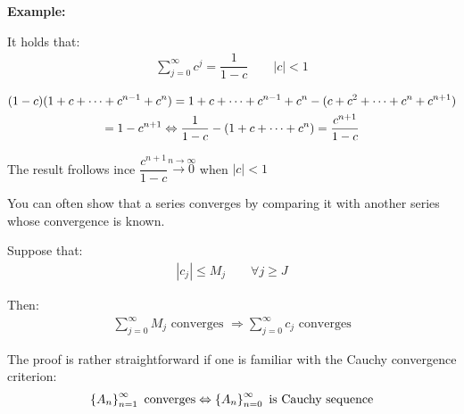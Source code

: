 \par\bigskip
\noindent\textbf{Example:}\par
\noindent It holds that:
\begin{equation*}
  \begin{gathered}
    \sum_{j=0}^{\infty}c^j = \dfrac{1}{1-c}\qquad\left|c\right|<1
  \end{gathered}
\end{equation*}
\par\bigskip
\begin{prf}[]{}
  \begin{equation*}
    \begin{gathered}
      (1-c)(1+c+\cdots+c^{n-1}+c^n) = 1+c+\cdots+c^{n-1}+c^n - (c+c^2+\cdots+c^n+c^{n+1})\\
      = 1-c^{n+1}\Leftrightarrow \dfrac{1}{1-c} - (1+c+\cdots+c^n) = \dfrac{c^{n+1}}{1-c}
    \end{gathered}
  \end{equation*}
  \par\bigskip
  \noindent The result frollows ince $\dfrac{c^{n+1}}{1-c}\stackrel{n\to\infty}{\to0}$ when $\left|c\right|<1$
\end{prf}
\par\bigskip
\noindent You can often show that a series converges by comparing it with another series whose convergence is known.
\par\bigskip
\begin{theo}{}
  Suppose that:
  \begin{equation*}
    \begin{gathered}
      \left|c_j\right|\leq M_j\qquad\forall j\geq J
    \end{gathered}
  \end{equation*}\par
  \noindent Then:
  \begin{equation*}
    \begin{gathered}
      \sum_{j=0}^{\infty}M_j\text{ converges } \Rightarrow \sum_{j=0}^{\infty}c_j \text{ converges}
    \end{gathered}
  \end{equation*}
\end{theo}
\par\bigskip
\noindent The proof is rather straightforward if one is familiar with the Cauchy convergence criterion:
\begin{equation*}
  \begin{gathered}
    \left\{A_n\right\}_{n=1}^\infty\text{ converges} \Leftrightarrow \left\{A_n\right\}_{n=0}^\infty\text{ is Cauchy sequence}
  \end{gathered}
\end{equation*}
